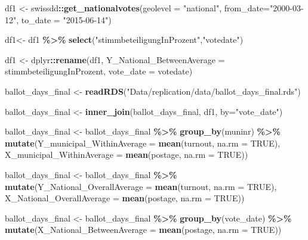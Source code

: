 \documentclass[
]{book}
\newenvironment{Shaded}{\begin{snugshade}}{\end{snugshade}}
\newcommand{\AttributeTok}[1]{\textcolor[rgb]{0.13,0.29,0.53}{#1}}
\newcommand{\ConstantTok}[1]{\textcolor[rgb]{0.56,0.35,0.01}{#1}}
\newcommand{\FunctionTok}[1]{\textcolor[rgb]{0.13,0.29,0.53}{\textbf{#1}}}
\newcommand{\NormalTok}[1]{#1}
\newcommand{\OtherTok}[1]{\textcolor[rgb]{0.56,0.35,0.01}{#1}}
\newcommand{\SpecialCharTok}[1]{\textcolor[rgb]{0.81,0.36,0.00}{\textbf{#1}}}
\newcommand{\StringTok}[1]{\textcolor[rgb]{0.31,0.60,0.02}{#1}}
\begin{document}
\begin{Shaded}
\begin{Highlighting}[]
\NormalTok{df1 }\OtherTok{\textless{}{-}}\NormalTok{ swissdd}\SpecialCharTok{::}\FunctionTok{get\_nationalvotes}\NormalTok{(}\AttributeTok{geolevel =} \StringTok{"national"}\NormalTok{, }\AttributeTok{from\_date=}\StringTok{"2000{-}03{-}12"}\NormalTok{, }\AttributeTok{to\_date =} \StringTok{"2015{-}06{-}14"}\NormalTok{)}

\NormalTok{df1}\OtherTok{\textless{}{-}}\NormalTok{ df1 }\SpecialCharTok{\%\textgreater{}\%}
  \FunctionTok{select}\NormalTok{(}\StringTok{"stimmbeteiligungInProzent"}\NormalTok{,}\StringTok{"votedate"}\NormalTok{)}
  
\NormalTok{df1 }\OtherTok{\textless{}{-}}\NormalTok{ dplyr}\SpecialCharTok{::}\FunctionTok{rename}\NormalTok{(df1, }\AttributeTok{Y\_National\_BetweenAverage =}\NormalTok{ stimmbeteiligungInProzent, }\AttributeTok{vote\_date =}\NormalTok{ votedate)}


\NormalTok{ballot\_days\_final }\OtherTok{\textless{}{-}} \FunctionTok{readRDS}\NormalTok{(}\StringTok{"Data/replication/data/ballot\_days\_final.rds"}\NormalTok{)  }

\NormalTok{ballot\_days\_final }\OtherTok{\textless{}{-}} \FunctionTok{inner\_join}\NormalTok{(ballot\_days\_final, df1, }\AttributeTok{by=}\StringTok{"vote\_date"}\NormalTok{)  }

\NormalTok{ballot\_days\_final }\OtherTok{\textless{}{-}}\NormalTok{ ballot\_days\_final }\SpecialCharTok{\%\textgreater{}\%}
  \FunctionTok{group\_by}\NormalTok{(muninr) }\SpecialCharTok{\%\textgreater{}\%}
  \FunctionTok{mutate}\NormalTok{(}\AttributeTok{Y\_municipal\_WithinAverage =} \FunctionTok{mean}\NormalTok{(turnout, }\AttributeTok{na.rm =} \ConstantTok{TRUE}\NormalTok{), }
         \AttributeTok{X\_municipal\_WithinAverage =} \FunctionTok{mean}\NormalTok{(postage, }\AttributeTok{na.rm =} \ConstantTok{TRUE}\NormalTok{))}


\NormalTok{ballot\_days\_final }\OtherTok{\textless{}{-}}\NormalTok{ ballot\_days\_final }\SpecialCharTok{\%\textgreater{}\%}
  \FunctionTok{mutate}\NormalTok{(}\AttributeTok{Y\_National\_OverallAverage =} \FunctionTok{mean}\NormalTok{(turnout, }\AttributeTok{na.rm =} \ConstantTok{TRUE}\NormalTok{),}
         \AttributeTok{X\_National\_OverallAverage =} \FunctionTok{mean}\NormalTok{(postage, }\AttributeTok{na.rm =} \ConstantTok{TRUE}\NormalTok{))}

\NormalTok{ballot\_days\_final }\OtherTok{\textless{}{-}}\NormalTok{ ballot\_days\_final }\SpecialCharTok{\%\textgreater{}\%}
  \FunctionTok{group\_by}\NormalTok{(vote\_date) }\SpecialCharTok{\%\textgreater{}\%}
  \FunctionTok{mutate}\NormalTok{(}\AttributeTok{X\_National\_BetweenAverage =} \FunctionTok{mean}\NormalTok{(postage, }\AttributeTok{na.rm =} \ConstantTok{TRUE}\NormalTok{))}
         


\end{Highlighting}
\end{Shaded}
\end{document}
